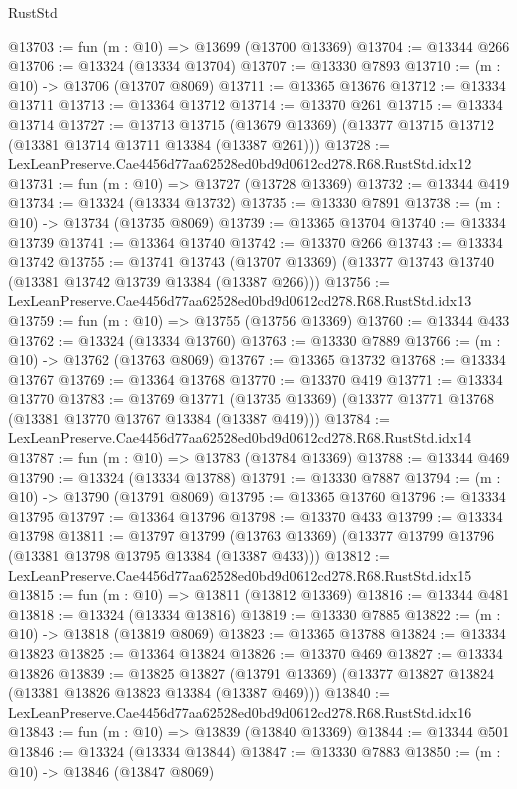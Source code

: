 \begin{lexlean}{RustStd}
\begin{coremodule}
@13703 := fun (m : @10) => @13699 (@13700 @13369)
@13704 := @13344 @266
@13706 := @13324 (@13334 @13704)
@13707 := @13330 @7893
@13710 := (m : @10) -> @13706 (@13707 @8069)
@13711 := @13365 @13676
@13712 := @13334 @13711
@13713 := @13364 @13712
@13714 := @13370 @261
@13715 := @13334 @13714
@13727 := @13713
    @13715
    (@13679 @13369)
    (@13377 @13715 @13712 (@13381 @13714 @13711 @13384 (@13387 @261)))
@13728 := LexLeanPreserve.Cae4456d77aa62528ed0bd9d0612cd278.R68.RustStd.idx12
@13731 := fun (m : @10) => @13727 (@13728 @13369)
@13732 := @13344 @419
@13734 := @13324 (@13334 @13732)
@13735 := @13330 @7891
@13738 := (m : @10) -> @13734 (@13735 @8069)
@13739 := @13365 @13704
@13740 := @13334 @13739
@13741 := @13364 @13740
@13742 := @13370 @266
@13743 := @13334 @13742
@13755 := @13741
    @13743
    (@13707 @13369)
    (@13377 @13743 @13740 (@13381 @13742 @13739 @13384 (@13387 @266)))
@13756 := LexLeanPreserve.Cae4456d77aa62528ed0bd9d0612cd278.R68.RustStd.idx13
@13759 := fun (m : @10) => @13755 (@13756 @13369)
@13760 := @13344 @433
@13762 := @13324 (@13334 @13760)
@13763 := @13330 @7889
@13766 := (m : @10) -> @13762 (@13763 @8069)
@13767 := @13365 @13732
@13768 := @13334 @13767
@13769 := @13364 @13768
@13770 := @13370 @419
@13771 := @13334 @13770
@13783 := @13769
    @13771
    (@13735 @13369)
    (@13377 @13771 @13768 (@13381 @13770 @13767 @13384 (@13387 @419)))
@13784 := LexLeanPreserve.Cae4456d77aa62528ed0bd9d0612cd278.R68.RustStd.idx14
@13787 := fun (m : @10) => @13783 (@13784 @13369)
@13788 := @13344 @469
@13790 := @13324 (@13334 @13788)
@13791 := @13330 @7887
@13794 := (m : @10) -> @13790 (@13791 @8069)
@13795 := @13365 @13760
@13796 := @13334 @13795
@13797 := @13364 @13796
@13798 := @13370 @433
@13799 := @13334 @13798
@13811 := @13797
    @13799
    (@13763 @13369)
    (@13377 @13799 @13796 (@13381 @13798 @13795 @13384 (@13387 @433)))
@13812 := LexLeanPreserve.Cae4456d77aa62528ed0bd9d0612cd278.R68.RustStd.idx15
@13815 := fun (m : @10) => @13811 (@13812 @13369)
@13816 := @13344 @481
@13818 := @13324 (@13334 @13816)
@13819 := @13330 @7885
@13822 := (m : @10) -> @13818 (@13819 @8069)
@13823 := @13365 @13788
@13824 := @13334 @13823
@13825 := @13364 @13824
@13826 := @13370 @469
@13827 := @13334 @13826
@13839 := @13825
    @13827
    (@13791 @13369)
    (@13377 @13827 @13824 (@13381 @13826 @13823 @13384 (@13387 @469)))
@13840 := LexLeanPreserve.Cae4456d77aa62528ed0bd9d0612cd278.R68.RustStd.idx16
@13843 := fun (m : @10) => @13839 (@13840 @13369)
@13844 := @13344 @501
@13846 := @13324 (@13334 @13844)
@13847 := @13330 @7883
@13850 := (m : @10) -> @13846 (@13847 @8069)

\end{coremodule}
\end{lexlean}
